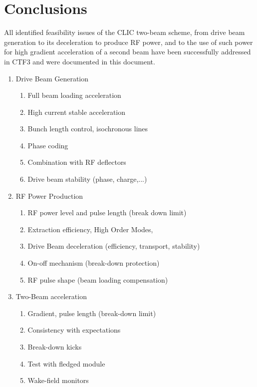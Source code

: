 
\chapter{Conclusions}
\label{sec.Conclusions}

All identified feasibility issues of the CLIC two-beam scheme, from drive beam
generation to its deceleration to produce RF power, and to the use of such power for
high gradient acceleration of a second beam have been successfully addressed in CTF3
and were documented in this document. 
\begin{enumerate}
\item Drive Beam Generation                      
  \begin{enumerate}
    \item Full beam loading acceleration	
    \item High current stable acceleration	
    \item Bunch length control, isochronous lines	
    \item Phase coding		
    \item Combination with RF deflectors	
    \item Drive beam stability (phase, charge,...)
  \end{enumerate}
\item RF Power Production
  \begin{enumerate}
   \item RF power level and pulse length (break down limit)	 
   \item Extraction efficiency, High Order Modes,	
   \item Drive Beam deceleration (efficiency, transport, stability)  
   \item On-off mechanism (break-down protection) 	 
   \item RF pulse shape (beam loading compensation)	   
  \end{enumerate}
\item Two-Beam acceleration
  \begin{enumerate}
   \item Gradient, pulse length (break-down limit) 
   \item Consistency with expectations	  
   \item Break-down kicks		  
   \item Test with fledged module	
   \item Wake-field monitors		  
  \end{enumerate}
\end{enumerate}

